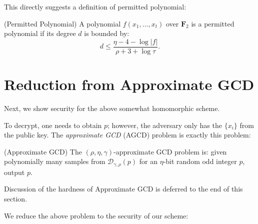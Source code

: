 This directly suggests a definition of permitted polynomial:
\begin{definition} (Permitted Polynomial) \label{def: permpoly}
A polynomial $f(x_1, \dots, x_t)$ over $\mathbf{F}_2$ is a permitted polynomial if its degree $d$ is bounded by:
\[d \leq \frac{\eta - 4 - \log |f|}{\rho + 3 + \log \tau}.\]
\end{definition}


\section{Reduction from Approximate GCD}
\label{sec: dghvsecurity}

Next, we show security for the above somewhat homomorphic scheme.

To decrypt, one needs to obtain $p$; however, the adversary only has the $\{x_i\}$ from the public key. The \emph{approximate GCD} (AGCD) problem is exactly this problem:
\begin{definition} (Approximate GCD)
The $(\rho, \eta, \gamma)$-approximate GCD problem is: given polynomially many samples from $\mathcal{D}_{\gamma, \rho}(p)$ for an $\eta$-bit random odd integer $p$, output $p$.
\end{definition}

Discussion of the hardness of Approximate GCD is deferred to the end of this section.

We reduce the above problem to the security of our scheme:

